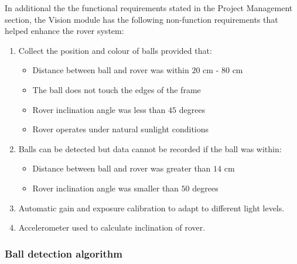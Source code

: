 \documentclass[11pt, a4paper]{article}
\begin{document}
In additional the the functional requirements stated in the Project Management section, the Vision module has the following non-function requirements that helped enhance the rover system:
\begin{enumerate}
    \item Collect the position and colour of balls provided that:
    \begin{itemize}
        \item Distance between ball and rover was within $20$ cm - $80$ cm
        \item The ball does not touch the edges of the frame
        \item Rover inclination angle was less than $45$ degrees
        \item Rover operates under natural sunlight conditions
    \end{itemize}

    \item Balls can be detected but data cannot be recorded if the ball was within:
    \begin{itemize}
        \item Distance between ball and rover was greater than $14$ cm
        \item Rover inclination angle was smaller than $50$ degrees
    \end{itemize}

    \item Automatic gain and exposure calibration to adapt to different light levels.
    \item Accelerometer used to calculate inclination of rover.
\end{enumerate}

\subsubsection{Ball detection algorithm}
\end{document}

